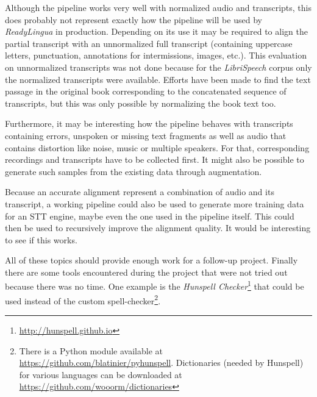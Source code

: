 Although the pipeline works very well with normalized audio and transcripts, this does probably not represent exactly how the pipeline will be used by \textit{ReadyLingua} in production. Depending on its use it may be required to align the partial transcript with an unnormalized full transcript (containing uppercase letters, punctuation, annotations for intermissions, images, etc.). This evaluation on unnormalized transcripts was not done because for the \textit{LibriSpeech} corpus only the normalized transcripts were available. Efforts have been made to find the text passage in the original book corresponding to the concatenated sequence of transcripts, but this was only possible by normalizing the book text too.

Furthermore, it may be interesting how the pipeline behaves with transcripts containing errors, unspoken or missing text fragments as well as audio that contains distortion like noise, music or multiple speakers. For that, corresponding recordings and transcripts have to be collected first. It might also be possible to generate such samples from the existing data through augmentation.

Because an accurate alignment represent a combination of audio and its transcript, a working pipeline could also be used to generate more training data for an \ac{STT} engine, maybe even the one used in the pipeline itself. This could then be used to recursively improve the alignment quality. It would be interesting to see if this works.

All of these topics should provide enough work for a follow-up project. Finally there are some tools encountered during the project that were not tried out because there was no time. One example is the \textit{Hunspell Checker}\footnote{\url{http://hunspell.github.io}} that could be used instead of the custom spell-checker\footnote{There is a Python module available at \url{https://github.com/blatinier/pyhunspell}. Dictionaries (needed by Hunspell) for various languages can be downloaded at \url{https://github.com/wooorm/dictionaries}}.